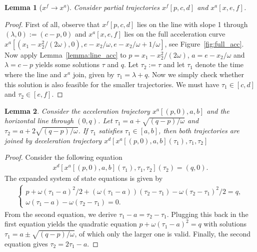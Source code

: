 \documentclass[a4paper]{article}
\theoremstyle{definition}
\theoremstyle{plain}
\newtheorem{lemma}{Lemma\hspace{0.25em}\ignorespaces}
\begin{document}
\begin{lemma}[$x^{f} \rightarrow x^{a}$]
Consider partial trajectories $x^{f}[p, c, d]$ and $x^{a}[x, e, f]$.
\end{lemma}
\begin{proof}
  First of all, observe that $x^{f}[p, c, d]$ lies on the line with slope 1
  through $(\lambda, 0) := (c - p, 0)$ and $x^{a}[x, e, f]$ lies on the full
  acceleration curve
  $x^{a}[(x_{1} - x_{2}^{2}/(2\omega) , 0), e - x_{2}/\omega, e - x_{2}/\omega + 1/\omega]$, see
  Figure~\ref{fig:full_acc}.
  Now apply Lemma~\ref{lemma:line_acc} to $p = x_{1} - x_{2}^{2}/(2\omega)$,
  $a = e - x_{2}/\omega$ and $\lambda = c - p$ yields some solutions $\tau$ and $q$.
  Let $\tau_{2} := \tau$ and let $\tau_{1}$ denote the time where the line and
  $x^{a}$ join, given by $\tau_{1} = \lambda + q$. Now we simply check whether this
  solution is also feasible for the smaller trajectories. We must have
  $\tau_{1} \in [c, d]$ and $\tau_{2} \in [e, f]$.
\end{proof}


\begin{lemma}
  \label{lemma:acc_hline}
  Consider the acceleration trajectory $x^{a}[(p, 0), a, b]$ and the horizontal
  line through $(0, q)$. Let $\tau_{1} = a + \sqrt{(q-p)/\omega}$ and
  $\tau_{2} = a + 2\sqrt{(q-p)/\omega}$. If $\tau_{1}$ satisfies
  $\tau_{1} \in [a, b]$, then both trajectories are joined by deceleration
  trajectory $x^{d}[x^{a}[(p, 0), a, b](\tau_{1}), \tau_{1}, \tau_{2}]$
\end{lemma}
\begin{proof}
  Consider the following equation
  \begin{align*}
    x^{d}[x^{a}[(p, 0),a,b](\tau_{1}), \tau_{1}, \tau_{2}](\tau_{2}) = (q, 0) .
  \end{align*}
  The expanded system of state equations is given by
  \begin{align*}
    \begin{cases}
      p + \omega (\tau_{1} - a)^{2}/2 + (\omega(\tau_{1} - a)) (\tau_{2} - \tau_{1}) - \omega(\tau_{2} - \tau_{1})^{2}/2 = q , \\
      \omega(\tau_{1} - a) - \omega(\tau_{2} - \tau_{1}) = 0 .
    \end{cases}
  \end{align*}
  From the second equation, we derive $\tau_{1} - a = \tau_{2} - \tau_{1}$.
  Plugging this back in the first equation yields the quadratic equation
  $p + \omega(\tau_{1} - a)^{2} = q$ with solutions
  $\tau_{1} = a \pm \sqrt{(q-p)/\omega}$, of which only the larger one is valid.
  Finally, the second equation gives $\tau_{2} = 2\tau_{1} - a$.
\end{proof}
\end{document}
